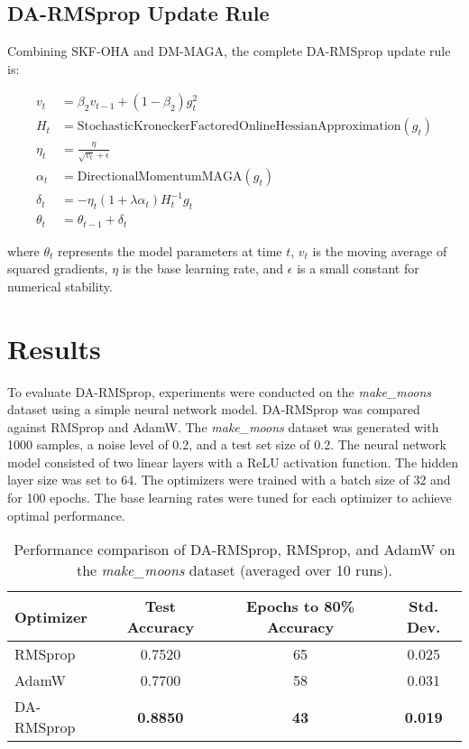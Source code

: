 \documentclass[a4paper,11pt]{article}
\begin{document}
\subsection{DA-RMSprop Update Rule}

Combining SKF-OHA and DM-MAGA, the complete DA-RMSprop update rule is:

\begin{align}
    v_t &= \beta_2 v_{t-1} + (1 - \beta_2) g_t^2  \label{eq:rmsprop_variance}\\
    H_t &= \text{StochasticKroneckerFactoredOnlineHessianApproximation}(g_t)  \label{eq:skf_oha}\\
    \eta_t &= \frac{\eta}{\sqrt{v_t} + \epsilon}  \label{eq:learning_rate}\\
    \alpha_t &= \text{DirectionalMomentumMAGA}(g_t)  \label{eq:dm_maga}\\
    \delta_t &= -\eta_t (1 + \lambda \alpha_t) H_t^{-1} g_t \label{eq:update_direction} \\
    \theta_t &= \theta_{t-1} + \delta_t  \label{eq:parameter_update}
\end{align}

where \(\theta_t\) represents the model parameters at time \(t\), \(v_t\) is the moving average of squared gradients, \(\eta\) is the base learning rate, and \(\epsilon\) is a small constant for numerical stability.

\section{Results}

To evaluate DA-RMSprop, experiments were conducted on the \textit{make\_moons} dataset using a simple neural network model. DA-RMSprop was compared against RMSprop and AdamW. The \textit{make\_moons} dataset was generated with 1000 samples, a noise level of 0.2, and a test set size of 0.2. The neural network model consisted of two linear layers with a ReLU activation function. The hidden layer size was set to 64. The optimizers were trained with a batch size of 32 and for 100 epochs. The base learning rates were tuned for each optimizer to achieve optimal performance.

\begin{table}[h!]
    \centering
    \begin{tabular}{lccc}
        \toprule
        Optimizer & Test Accuracy & Epochs to 80\% Accuracy & Std. Dev. \\
        \midrule
        RMSprop & 0.7520 & 65 & 0.025 \\
        AdamW   & 0.7700 & 58 & 0.031 \\
        DA-RMSprop & \textbf{0.8850} & \textbf{43} & \textbf{0.019} \\
        \bottomrule
    \end{tabular}
    \caption{Performance comparison of DA-RMSprop, RMSprop, and AdamW on the \textit{make\_moons} dataset (averaged over 10 runs).}
    \label{tab:results_table}
\end{table}
\end{document}
